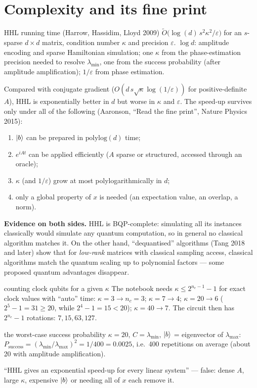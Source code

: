 \documentclass[11pt,a4paper,openany]{book}
\newcounter{wex}[chapter]
\begin{document}
\section{Complexity and its fine print}
\begin{keyres}{HHL running time (Harrow, Hassidim, Lloyd 2009)}
$\tilde O\big(\log(d)\,s^2\kappa^2/\varepsilon\big)$ for an $s$-sparse $d\times d$ matrix, condition number $\kappa$ and precision $\varepsilon$.
$\log d$: amplitude encoding and sparse Hamiltonian simulation; one $\kappa$ from the phase-estimation precision needed to resolve $\lambda_{\min}$,
one from the success probability (after amplitude amplification); $1/\varepsilon$ from phase estimation.
\end{keyres}
Compared with conjugate gradient ($O(d\,s\sqrt\kappa\log(1/\varepsilon))$ for positive-definite $A$), HHL is exponentially better in $d$ but worse in $\kappa$ and $\varepsilon$.
The speed-up survives only under all of the following (Aaronson, ``Read the fine print'', Nature Physics 2015):
\begin{enumerate}[itemsep=1pt]
\item $\ket b$ can be prepared in $\mathrm{polylog}(d)$ time;
\item $e^{iAt}$ can be applied efficiently ($A$ sparse or structured, accessed through an oracle);
\item $\kappa$ (and $1/\varepsilon$) grow at most polylogarithmically in $d$;
\item only a global property of $x$ is needed (an expectation value, an overlap, a norm).
\end{enumerate}
\textbf{Evidence on both sides.} HHL is BQP-complete: simulating all its instances classically would simulate any quantum computation, so in general no classical
algorithm matches it. On the other hand, ``dequantised'' algorithms (Tang 2018 and later) show that for \emph{low-rank} matrices with classical sampling access,
classical algorithms match the quantum scaling up to polynomial factors --- some proposed quantum advantages disappear.
\begin{wexample}{counting clock qubits for a given $\kappa$}
The notebook needs $\kappa \le 2^{n_c-1} - 1$ for exact clock values with ``auto'' time: $\kappa = 3 \to n_c = 3$; $\kappa = 7 \to 4$; $\kappa = 20 \to 6$ ($2^5 - 1 = 31 \ge 20$, while $2^4 - 1 = 15 < 20$);
$\kappa = 40 \to 7$. The circuit then has $2^{n_c} - 1$ rotations: $7, 15, 63, 127$.
\end{wexample}
\begin{wexample}{the worst-case success probability}
$\kappa = 20$, $C = \lambda_{\min}$, $\ket b$ = eigenvector of $\lambda_{\max}$: $P_{\text{success}} = (\lambda_{\min}/\lambda_{\max})^2 = 1/400 = 0.0025$, i.e.\ 400 repetitions on average
(about 20 with amplitude amplification).
\end{wexample}
\begin{trap}
``HHL gives an exponential speed-up for every linear system'' --- false: dense $A$, large $\kappa$, expensive $\ket b$ or needing all of $x$ each remove it.
\end{trap}
\end{document}
